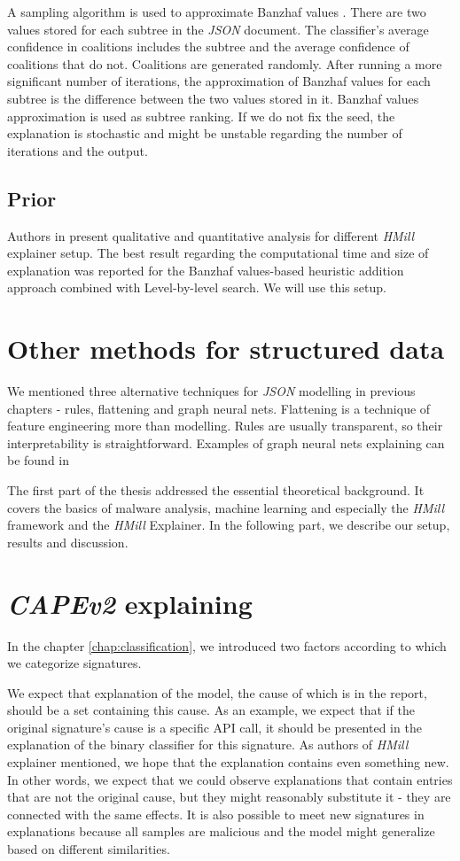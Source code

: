 A sampling algorithm is used to approximate Banzhaf values \cite{Bachrach2010}. There are two values stored for each subtree in the \emph{JSON} document. The classifier's average confidence in coalitions includes the subtree and the average confidence of coalitions that do not. Coalitions are generated randomly. After running a more significant number of iterations, the approximation of Banzhaf values for each subtree is the difference between the two values stored in it. Banzhaf values approximation is used as subtree ranking. If we do not fix the seed, the explanation is stochastic and might be unstable regarding the number of iterations and the output.

\subsection{Prior}
Authors in \cite{Pevny2020} present qualitative and quantitative analysis for different \emph{HMill} explainer setup. The best result regarding the computational time and size of explanation was reported for the Banzhaf values-based heuristic addition approach combined with Level-by-level search. We will use this setup.

\section{Other methods for structured data}
We mentioned three alternative techniques for \emph{JSON} modelling in previous chapters - rules, flattening and graph neural nets. Flattening is a technique of feature engineering more than modelling. Rules are usually transparent, so their interpretability is straightforward. Examples of graph neural nets explaining can be found in \cite{Ying2019, Huang2020} 

The first part of the thesis addressed the essential theoretical background. It covers the basics of malware analysis, machine learning and especially the \emph{HMill} framework and the \emph{HMill} Explainer. In the following part, we describe our setup, results and discussion.

\section{\emph{CAPEv2} explaining}
In the chapter \ref{chap:classification}, we introduced two factors according to which we categorize signatures.

We expect that explanation of the model, the cause of which is in the report, should be a set containing this cause. As an example, we expect that if the original signature's cause is a specific API call, it should be presented in the explanation of the binary classifier for this signature. As authors of \emph{HMill} explainer mentioned, we hope that the explanation contains even something new. In other words, we expect that we could observe explanations that contain entries that are not the original cause, but they might reasonably substitute it - they are connected with the same effects. It is also possible to meet new signatures in explanations because all samples are malicious and the model might generalize based on different similarities.

